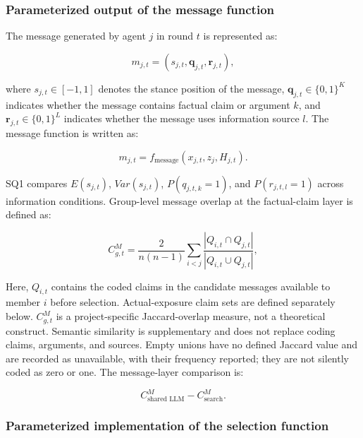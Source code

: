 \documentclass[11pt,a4paper]{article}
\begin{document}
\subsubsection{Parameterized output of the message function}

The message generated by agent $j$ in round $t$ is represented as:

\begin{equation*}
m_{j,t}
=
\left(
s_{j,t},
\mathbf q_{j,t},
\mathbf r_{j,t}
\right),
\end{equation*}

where $s_{j,t}\in[-1,1]$ denotes the stance position of the message, $\mathbf q_{j,t}\in\{0,1\}^{K}$ indicates whether the message contains factual claim or argument $k$, and $\mathbf r_{j,t}\in\{0,1\}^{L}$ indicates whether the message uses information source $l$. The message function is written as:

\begin{equation*}
m_{j,t}
=
f_{\text{message}}
(x_{j,t},z_j,H_{j,t}).
\end{equation*}

SQ1 compares $E(s_{j,t})$, $Var(s_{j,t})$, $P(q_{j,t,k}=1)$, and $P(r_{j,t,l}=1)$ across information conditions. Group-level message overlap at the factual-claim layer is defined as:

\begin{equation*}
C^{M}_{g,t}
=
\frac{2}{n(n-1)}
\sum_{i<j}
\frac{|Q_{i,t}\cap Q_{j,t}|}
{|Q_{i,t}\cup Q_{j,t}|},
\end{equation*}

Here, $Q_{i,t}$ contains the coded claims in the candidate messages available to member $i$ before selection. Actual-exposure claim sets are defined separately below. $C^{M}_{g,t}$ is a project-specific Jaccard-overlap measure, not a theoretical construct. Semantic similarity is supplementary and does not replace coding claims, arguments, and sources. Empty unions have no defined Jaccard value and are recorded as unavailable, with their frequency reported; they are not silently coded as zero or one. The message-layer comparison is:

\begin{equation*}
C^{M}_{\text{shared LLM}}
-
C^{M}_{\text{search}}.
\end{equation*}

\subsubsection{Parameterized implementation of the selection function}
\end{document}
